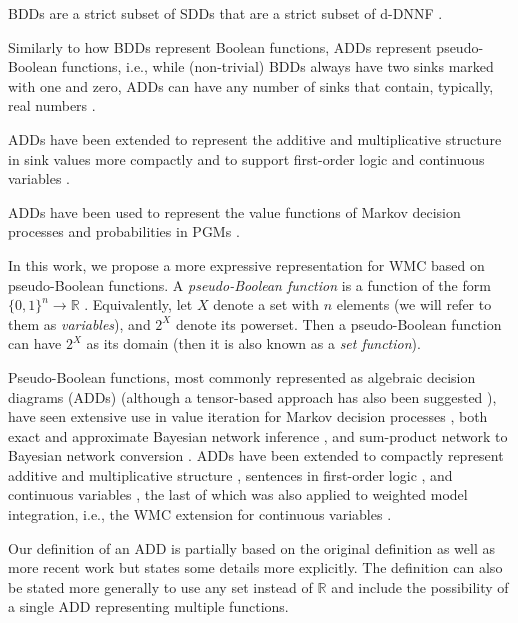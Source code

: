 BDDs are a strict subset of SDDs that are a strict subset of d-DNNF \citep{DBLP:conf/ijcai/Darwiche11}.

Similarly to how BDDs represent Boolean functions, ADDs represent pseudo-Boolean functions, i.e., while (non-trivial) BDDs always have two sinks marked with one and zero, ADDs can have any number of sinks that contain, typically, real numbers \citep{DBLP:journals/fmsd/BaharFGHMPS97}.

ADDs have been extended to represent the additive and multiplicative structure in sink values more compactly \citep{DBLP:conf/ijcai/SannerM05} and to support first-order logic \citep{DBLP:journals/ai/SannerB09} and continuous variables \citep{DBLP:conf/uai/SannerDB11}.

ADDs have been used to represent the value functions of Markov decision processes \citep{DBLP:conf/uai/HoeySHB99} and probabilities in PGMs \citep{DBLP:conf/ijcai/ChaviraD07,DBLP:conf/uai/GogateD11}.

In this work, we propose a more expressive representation for WMC based on
pseudo-Boolean functions. A \emph{pseudo-Boolean function} is a function of the
form $\{ 0, 1 \}^n \to \mathbb{R}$ \citep{DBLP:journals/dam/BorosH02}.
Equivalently, let $X$ denote a set with $n$ elements (we will refer to them as
\emph{variables}), and $2^X$ denote its powerset. Then a pseudo-Boolean function
can have $2^X$ as its domain (then it is also known as a \emph{set function}).

Pseudo-Boolean functions, most commonly represented as
algebraic decision diagrams (ADDs) \citep{DBLP:journals/fmsd/BaharFGHMPS97}
(although a tensor-based approach has also been suggested
\citep{DBLP:journals/corr/abs-1908-04381,DBLP:conf/cp/DudekPV20}), have seen
extensive use in value iteration for Markov decision processes
\citep{DBLP:conf/uai/HoeySHB99}, both exact and approximate Bayesian network
inference \citep{DBLP:conf/ijcai/ChaviraD07,DBLP:conf/uai/GogateD11}, and
sum-product network \citep{DBLP:conf/uai/PoonD11} to Bayesian network conversion
\citep{DBLP:conf/icml/ZhaoMP15}. ADDs have been extended to compactly represent
additive and multiplicative structure \citep{DBLP:conf/ijcai/SannerM05},
sentences in first-order logic \citep{DBLP:journals/ai/SannerB09}, and continuous
variables \citep{DBLP:conf/uai/SannerDB11}, the last of which was also applied to
weighted model integration, i.e., the WMC extension for continuous variables
\citep{DBLP:conf/ijcai/BellePB15,DBLP:conf/ijcai/KolbMSBK18}.

Our definition of an ADD is partially based on the original definition
\cite{DBLP:journals/fmsd/BaharFGHMPS97} as well as more recent work
\cite{DBLP:conf/cp/DudekPV20} but states some details more explicitly. The
definition can also be stated more generally to use any set instead of
$\mathbb{R}$ and include the possibility of a single ADD representing multiple
functions.

